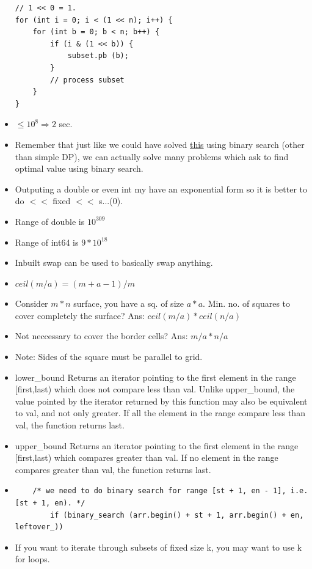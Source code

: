 \documentclass[8pt, a4paper, oneside, twocolumn]{extarticle}
\begin{document}
\begin{itemize}
\begin{verbatim}
// 1 << 0 = 1.
for (int i = 0; i < (1 << n); i++) {
    for (int b = 0; b < n; b++) {
        if (i & (1 << b)) {
            subset.pb (b);
        }
        // process subset
    }
}
\end{verbatim}
    \item $\leq 10^8 \Rightarrow 2$ sec.
    \item Remember that just like we could have solved \href{https://uva.onlinejudge.org/external/7/714.pdf}{this} using binary search (other than simple DP), we can actually solve many problems which ask to find optimal value using binary search.
    \item Outputing a double or even int my have an exponential form so it is better to do $<<$ fixed $<<$ s...(0).
    \item Range of double is $10^{309}$
    \item Range of int64 is $9 * 10^{18}$
    \item Inbuilt swap can be used to basically swap anything.
    \item $ceil(m/a) = (m + a - 1) / m$
    \item Consider $m*n$ surface, you have a sq. of size $a*a$. Min. no. of squares to cover completely the surface? Ans: $ceil(m/a)*ceil(n/a)$
    \item Not neccessary to cover the border cells? Ans: $m/a * n/a$
    \item Note: Sides of the square must be parallel to grid.
    \item  lower\_bound Returns an iterator pointing to the first element in the range [first,last) which does not compare less than val. Unlike upper\_bound, the value pointed by the iterator returned by this function may also be equivalent to val, and not only greater. If all the element in the range compare less than val, the function returns last.
    \item upper\_bound Returns an iterator pointing to the first element in the range [first,last) which compares greater than val. If no element in the range compares greater than val, the function returns last.
    \item 
    \begin{verbatim}
    /* we need to do binary search for range [st + 1, en - 1], i.e. [st + 1, en). */
        if (binary_search (arr.begin() + st + 1, arr.begin() + en, leftover_))
    \end{verbatim}
    \item If you want to iterate through subsets of fixed size k, you may want to use k for loops.

\end{itemize}
\end{document}
